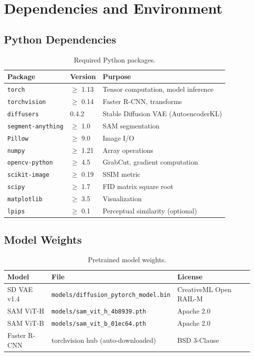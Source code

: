 \documentclass[11pt,a4paper]{article}
\begin{document}
\section{Dependencies and Environment}

\subsection{Python Dependencies}

\begin{table}[h]
\centering
\small
\caption{Required Python packages.}
\begin{tabularx}{\textwidth}{llX}
\toprule
\textbf{Package} & \textbf{Version} & \textbf{Purpose} \\
\midrule
\texttt{torch} & $\geq$ 1.13 & Tensor computation, model inference \\
\texttt{torchvision} & $\geq$ 0.14 & Faster R-CNN, transforms \\
\texttt{diffusers} & 0.4.2 & Stable Diffusion VAE (AutoencoderKL) \\
\texttt{segment-anything} & $\geq$ 1.0 & SAM segmentation \\
\texttt{Pillow} & $\geq$ 9.0 & Image I/O \\
\texttt{numpy} & $\geq$ 1.21 & Array operations \\
\texttt{opencv-python} & $\geq$ 4.5 & GrabCut, gradient computation \\
\texttt{scikit-image} & $\geq$ 0.19 & SSIM metric \\
\texttt{scipy} & $\geq$ 1.7 & FID matrix square root \\
\texttt{matplotlib} & $\geq$ 3.5 & Visualization \\
\texttt{lpips} & $\geq$ 0.1 & Perceptual similarity (optional) \\
\bottomrule
\end{tabularx}
\end{table}

\subsection{Model Weights}

\begin{table}[h]
\centering
\small
\caption{Pretrained model weights.}
\begin{tabularx}{\textwidth}{lXl}
\toprule
\textbf{Model} & \textbf{File} & \textbf{License} \\
\midrule
SD VAE v1.4 & \texttt{models/diffusion\_pytorch\_model.bin} & CreativeML Open RAIL-M \\
SAM ViT-H & \texttt{models/sam\_vit\_h\_4b8939.pth} & Apache 2.0 \\
SAM ViT-B & \texttt{models/sam\_vit\_b\_01ec64.pth} & Apache 2.0 \\
Faster R-CNN & torchvision hub (auto-downloaded) & BSD 3-Clause \\
\bottomrule
\end{tabularx}
\end{table}
\end{document}
